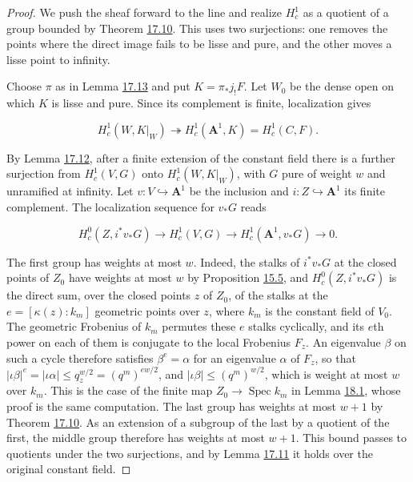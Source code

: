 \documentclass[11pt]{article}
\begin{document}
\begin{proof}[{Proof}]\label{bp267}%
We push the sheaf forward to the line and realize \(H^1_c\) as a quotient of a group bounded by Theorem \hyperref[bp252]{17.10}. This uses two surjections: one removes the points where the direct image fails to be lisse and pure, and the other moves a lisse point to infinity.

Choose \(\pi\) as in Lemma \hyperref[bp263]{17.13} and put \(K=\pi_*j_!F\). Let \(W_0\) be the dense open on which \(K\) is lisse and pure. Since its complement is finite, localization gives

\[
H_c^1(W,K|_W)\twoheadrightarrow
H_c^1(\mathbf A^1,K)=H_c^1(C,F).
\]

By Lemma \hyperref[bp260]{17.12}, after a finite extension of the constant field there is a further surjection from \(H_c^1(V,G)\) onto \(H_c^1(W,K|_W)\), with \(G\) pure of weight \(w\) and unramified at infinity. Let \(v:V\hookrightarrow\mathbf A^1\) be the inclusion and \(i:Z\hookrightarrow\mathbf A^1\) its finite complement. The localization sequence for \(v_*G\) reads

\[
H_c^0(Z,i^*v_*G)\longrightarrow H_c^1(V,G)
\longrightarrow H_c^1(\mathbf A^1,v_*G)\longrightarrow0.
\]

The first group has weights at most \(w\). Indeed, the stalks of \(i^*v_*G\) at the closed points of \(Z_0\) have weights at most \(w\) by Proposition \hyperref[bp134]{15.5}, and \(H_c^0(Z,i^*v_*G)\) is the direct sum, over the closed points \(z\) of \(Z_0\), of the stalks at the \(e=[\kappa(z):k_m]\) geometric points over \(z\), where \(k_m\) is the constant field of \(V_0\). The geometric Frobenius of \(k_m\) permutes these \(e\) stalks cyclically, and its \(e\)th power on each of them is conjugate to the local Frobenius \(F_z\). An eigenvalue \(\beta\) on such a cycle therefore satisfies \(\beta^e=\alpha\) for an eigenvalue \(\alpha\) of \(F_z\), so that \(|\iota\beta|^e=|\iota\alpha|\le q_z^{w/2}=(q^m)^{ew/2}\), and \(|\iota\beta|\le(q^m)^{w/2}\), which is weight at most \(w\) over \(k_m\). This is the case of the finite map \(Z_0\to\operatorname{Spec}k_m\) in Lemma \hyperref[bp275]{18.1}, whose proof is the same computation. The last group has weights at most \(w+1\) by Theorem \hyperref[bp252]{17.10}. As an extension of a subgroup of the last by a quotient of the first, the middle group therefore has weights at most \(w+1\). This bound passes to quotients under the two surjections, and by Lemma \hyperref[bp257]{17.11} it holds over the original constant field.
\end{proof}
\end{document}
